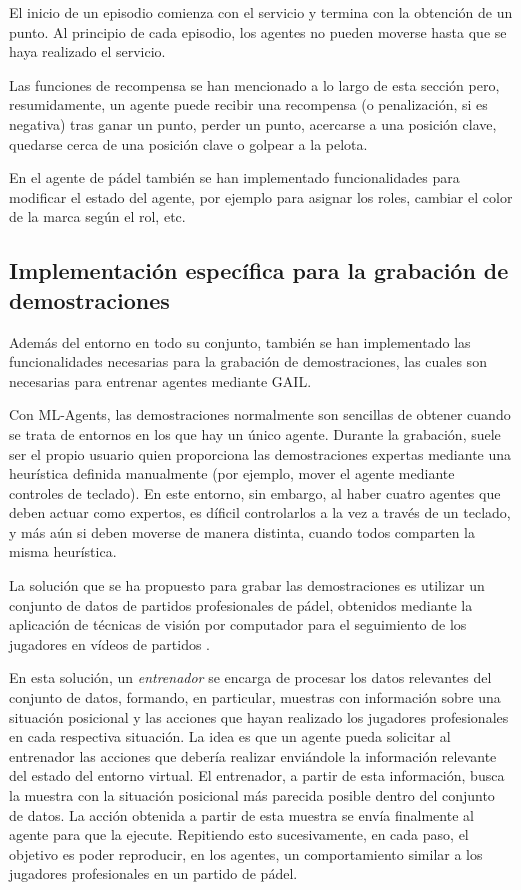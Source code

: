El inicio de un episodio comienza con el servicio y termina con la obtención de un punto. Al principio de cada episodio, los agentes no pueden moverse hasta que se haya realizado el servicio.

Las funciones de recompensa se han mencionado a lo largo de esta sección pero, resumidamente, un agente puede recibir una recompensa (o penalización, si es negativa) tras ganar un punto, perder un punto, acercarse a una posición clave, quedarse cerca de una posición clave o golpear a la pelota.

En el agente de pádel también se han implementado funcionalidades para modificar el estado del agente, por ejemplo para asignar los roles, cambiar el color de la marca según el rol, etc.

\subsection{Implementación específica para la grabación de demostraciones}

Además del entorno en todo su conjunto, también se han implementado las funcionalidades necesarias para la grabación de demostraciones, las cuales son necesarias para entrenar agentes mediante GAIL.

Con ML-Agents, las demostraciones normalmente son sencillas de obtener cuando se trata de entornos en los que hay un único agente. Durante la grabación, suele ser el propio usuario quien proporciona las demostraciones expertas mediante una heurística definida manualmente (por ejemplo, mover el agente mediante controles de teclado). En este entorno, sin embargo, al haber cuatro agentes que deben actuar como expertos, es díficil controlarlos a la vez a través de un teclado, y más aún si deben moverse de manera distinta, cuando todos comparten la misma heurística.

La solución que se ha propuesto para grabar las demostraciones es utilizar un conjunto de datos de partidos profesionales de pádel, obtenidos mediante la aplicación de técnicas de visión por computador para el seguimiento de los jugadores en vídeos de partidos \cite{s21103368}.

En esta solución, un \emph{entrenador} se encarga de procesar los datos relevantes del conjunto de datos, formando, en particular, muestras con información sobre una situación posicional y las acciones que hayan realizado los jugadores profesionales en cada respectiva situación. La idea es que un agente pueda solicitar al entrenador las acciones que debería realizar enviándole la información relevante del estado del entorno virtual. El entrenador, a partir de esta información, busca la muestra con la situación posicional más parecida posible dentro del conjunto de datos. La acción obtenida a partir de esta muestra se envía finalmente al agente para que la ejecute. Repitiendo esto sucesivamente, en cada paso, el objetivo es poder reproducir, en los agentes, un comportamiento similar a los jugadores profesionales en un partido de pádel.

